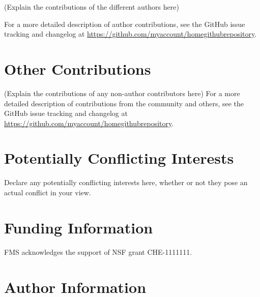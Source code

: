 \documentclass[9pt,tutorial]{livecoms}
\newcommand{\githubrepository}{\url{https://github.com/myaccount/homegithubrepository}}  %
\begin{document}
(Explain the contributions of the different authors here)

For a more detailed description of author contributions,
see the GitHub issue tracking and changelog at \githubrepository.

\section*{Other Contributions}
%

(Explain the contributions of any non-author contributors here)
For a more detailed description of contributions from the community and others, see the GitHub issue tracking and changelog at \githubrepository.

\section*{Potentially Conflicting Interests}

Declare any potentially conflicting interests here, whether or not they pose an actual conflict in your view.

\section*{Funding Information}
FMS acknowledges the support of NSF grant CHE-1111111.

\section*{Author Information}
\makeorcid




\end{document}
